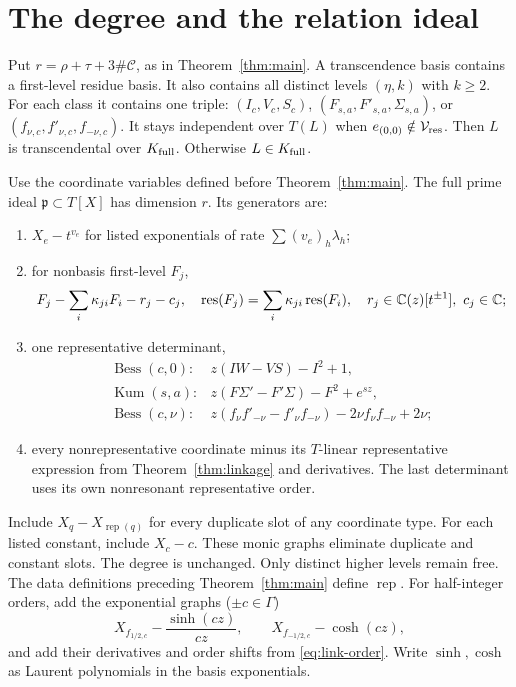 \section{The degree and the relation ideal}\label{sec:main-statement}
Put $r=\rho+\tau+3\#\mathcal C$, as in Theorem~\ref{thm:main}.
A transcendence basis contains a first-level residue basis.
It also contains all distinct levels $(\eta,k)$ with $k\ge2$.
For each class it contains one triple:
$(I_c,V_c,S_c)$, $(F_{s,a},F'_{s,a},\Sigma_{s,a})$, or
$(f_{\nu,c},f'_{\nu,c},f_{-\nu,c})$. It stays independent over $T(L)$
when $e_{(0,0)}\notin\mathcal V_{\rm res}$. Then $L$ is transcendental over
$K_{\rm full}$. Otherwise $L\in K_{\rm full}$.

Use the coordinate variables defined before Theorem~\ref{thm:main}.
The full prime ideal $\mathfrak p\subset T[X]$ has dimension $r$.
Its generators are:
\begin{enumerate}\setlength{\itemsep}{0pt}\setlength{\parsep}{0pt}
\item $X_e-t^{v_e}$ for listed exponentials of rate $\sum(v_e)_h\lambda_h$;
\item for nonbasis first-level $F_j$,
\begin{equation}\label{eq:residue-relations}
F_j-\sum_i\kappa_{ji}F_i-r_j-c_j,\quad
\operatorname{res}(F_j)=\sum_i\kappa_{ji}\operatorname{res}(F_i),\quad r_j\in\mathbb{C}(z)[t^{\pm1}],\ c_j\in\mathbb{C};
\end{equation}
\item one representative determinant,
\begin{equation}\label{eq:determinant-relations}
\begin{array}{ll}
\operatorname{Bess}(c,0):&z(IW-VS)-I^2+1,\\
\operatorname{Kum}(s,a):&z(F\Sigma'-F'\Sigma)-F^2+e^{sz},\\
\operatorname{Bess}(c,\nu):&z(f_\nu f'_{-\nu}-f'_\nu f_{-\nu})-2\nu f_\nu f_{-\nu}+2\nu;
\end{array}
\end{equation}
\item every nonrepresentative coordinate minus its $T$-linear representative
expression from Theorem~\ref{thm:linkage} and derivatives. The last determinant
uses its own nonresonant representative order. \end{enumerate}
Include $X_q-X_{\operatorname{rep}(q)}$ for every duplicate slot of any coordinate type.
For each listed constant, include $X_c-c$.
These monic graphs eliminate duplicate and constant slots.
The degree is unchanged. Only distinct higher levels remain free.
The data definitions preceding Theorem~\ref{thm:main} define $\operatorname{rep}$.
For half-integer orders, add the exponential graphs ($\pm c\in\Gamma$)
\[
 X_{f_{1/2,c}}-\frac{\sinh(cz)}{cz},\qquad
 X_{f_{-1/2,c}}-\cosh(cz),
\]
and add their derivatives and order shifts from \eqref{eq:link-order}.
Write $\sinh,\cosh$ as Laurent polynomials in the basis exponentials.

